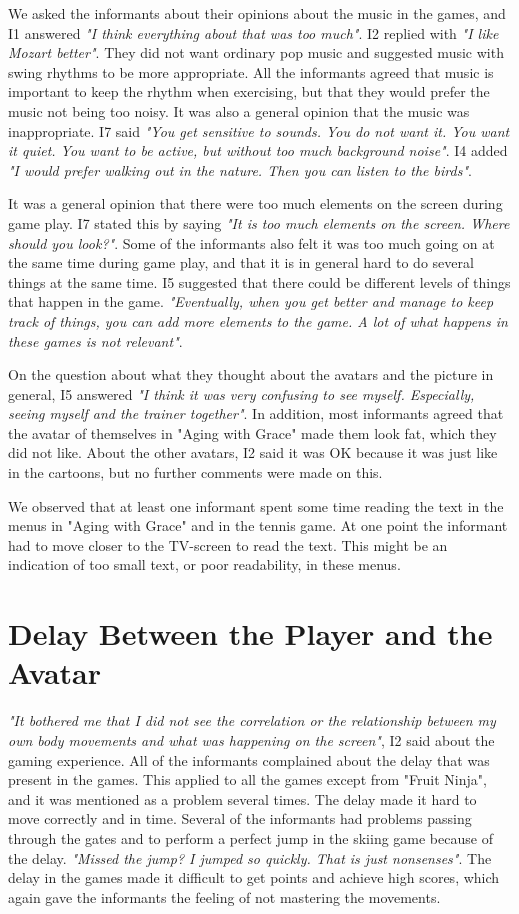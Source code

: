 We asked the informants about their opinions about the music in the games, and I1 answered \emph{"I think everything about that was too much"}. I2 replied with \emph{"I like Mozart better"}. They did not want ordinary pop music and suggested music with swing rhythms to be more appropriate. All the informants agreed that music is important to keep the rhythm when exercising, but that they would prefer the music not being too noisy. It was also a general opinion that the music was inappropriate.  I7 said \emph{"You get sensitive to sounds. You do not want it. You want it quiet. You want to be active, but without too much background noise"}. I4 added \emph{"I would prefer walking out in the nature. Then you can listen to the birds"}.

It was a general opinion that there were too much elements on the screen during game play. I7 stated this by saying \emph{"It is too much elements on the screen. Where should you look?"}. Some of the informants also felt it was too much going on at the same time during game play, and that it is in general hard to do several things at the same time. I5 suggested that there could be different levels of things that happen in the game.  \emph{"Eventually, when you get better and manage to keep track of things, you can add more elements to the game. A lot of what happens in these games is not relevant"}. 

On the question about what they thought about the avatars and the picture in general, I5 answered \emph{"I think it was very confusing to see myself. Especially, seeing myself and the trainer together"}. In addition, most informants agreed that the avatar of themselves in "Aging with Grace" made them look fat, which they did not like. About the other avatars, I2 said it was OK because it was just like in the cartoons, but no further comments were made on this.  

We observed that at least one informant spent some time reading the text in the menus in "Aging with Grace" and in the tennis game. At one point the informant had to move closer to the TV-screen to read the text. This might be an indication of too small text, or poor readability, in these menus. 

\section{Delay Between the Player and the Avatar}

\emph{"It bothered me that I did not see the correlation or the relationship between my own body movements and what was happening on the screen"}, I2 said about the gaming experience. All of the informants complained about the delay that was present in the games. This applied to all the games except from "Fruit Ninja", and it was mentioned as a problem several times. The delay made it hard to move correctly and in time. Several of the informants had problems passing through the gates and to perform a perfect jump in the skiing game because of the delay. \emph{"Missed the jump? I jumped so quickly. That is just nonsenses"}. The delay in the games made it difficult to get points and achieve high scores, which again gave the informants the feeling of not mastering the movements. 

